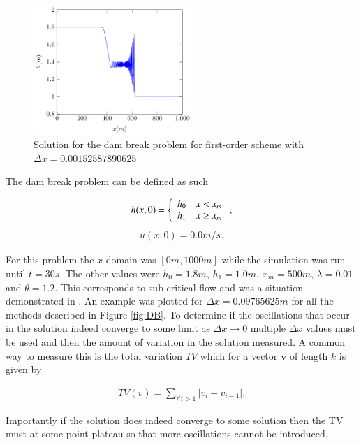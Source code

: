 \documentclass[SingleSpace,12pt]{Serre_ASCE}
\begin{document}
\begin{figure}[htb]
\centering
\includegraphics[width=6.0cm]{./results/dambreak/ex/o1-figure1.pdf}
\caption{Solution for the dam break problem for first-order scheme with $\Delta x = 0.00152587890625$}
\label{fig:DB1o1}
\end{figure}
The dam break problem can be defined as such
\begin{linenomath*}
\begin{gather}
h(x,0) = \left\lbrace \begin{array}{c c}
h_0 & x < x_m\\
h_1 & x \ge x_m\\
\end{array} \right. ,
\end{gather}
\begin{gather}
u(x,0) = 0.0m/s.
\end{gather}
\end{linenomath*}
For this problem the $x$ domain was $\left[0m,1000m\right]$ while the simulation was run until $t=30s$. The other values were $h_0 = 1.8m$, $h_1 = 1.0m$, $x_m = 500m$, $\lambda = 0.01$ and $\theta = 1.2$. This corresponds to sub-critical flow and was a situation demonstrated in \cite{El-etal-2006,Hank-etal-2010-2034}. An example was plotted for $\Delta x = 0.09765625m$ for all the methods described in Figure \ref{fig:DB}. To determine if the oscillations that occur in the solution indeed converge to some limit as $\Delta x \rightarrow 0$ multiple $\Delta x$ values must be used and then the amount of variation in the solution measured. A common way to measure this is the total variation $TV$ \cite{LeVeque-2002} which for a vector $\boldsymbol{v}$ of length $k$ is given by
\begin{linenomath*}
\begin{gather}
TV(v) = \sum_{\forall i >1} |v_{i} - v_{i-1}|.
\end{gather}
\end{linenomath*}
Importantly if the solution does indeed converge to some solution then the TV must at some point plateau so that more oscillations cannot be introduced.
\end{document}
